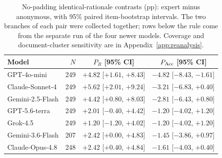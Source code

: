 \begin{table}[b]
\caption{No-padding identical-rationale contrasts (pp): expert minus anonymous, with 95\% paired item-bootstrap intervals. The two branches of each pair were collected together; rows below the rule come from the separate run of the four newer models. Coverage and document-cluster sensitivity are in Appendix~\ref{app:reanalysis}.}
\label{tab:paired_api}
\centering\small
\setlength{\tabcolsep}{3.5pt}
\begin{tabular}{lrcc}
\toprule
Model & $N$ & $P_R$ [95\% CI] & $P_{\rm Acc}$ [95\% CI] \\
\midrule
GPT-4o-mini & 249 & $+4.82$ [$+1.61$, $+8.43$] & $-4.82$ [$-8.43$, $-1.61$] \\
Claude-Sonnet-4 & 249 & $+5.62$ [$+2.01$, $+9.24$] & $-3.21$ [$-6.83$, $+0.40$] \\
Gemini-2.5-Flash & 249 & $+4.42$ [$+0.80$, $+8.03$] & $-2.81$ [$-6.43$, $+0.80$] \\
\midrule
GPT-5.6-terra & 249 & $+2.01$ [$-0.40$, $+4.42$] & $-1.20$ [$-4.02$, $+1.20$] \\
Grok-4.5 & 249 & $+1.20$ [$-1.20$, $+4.02$] & $-1.20$ [$-4.02$, $+1.20$] \\
Gemini-3.6-Flash & 207 & $+2.42$ [$+0.00$, $+4.83$] & $-1.45$ [$-3.86$, $+0.97$] \\
Claude-Opus-4.8 & 248 & $+2.42$ [$+0.40$, $+4.84$] & $-1.61$ [$-4.03$, $+0.40$] \\
\bottomrule
\end{tabular}
\end{table}
